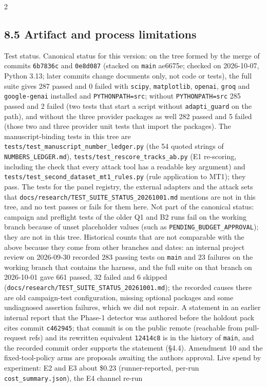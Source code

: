 \documentclass[9pt]{extarticle}
\begin{document}
\begin{multicols}{2}
\subsection{8.5 Artifact and process limitations}

Test status. Canonical status for this version: on the tree formed by the merge of commits \texttt{6b7836c} and \texttt{0e8d087} (stacked on \texttt{main} ae6675e; checked on 2026-10-07, Python 3.13; later commits change documents only, not code or tests), the full suite gives 287 passed and 0 failed with \texttt{scipy}, \texttt{matplotlib}, \texttt{openai}, \texttt{groq} and \texttt{google-genai} installed and \texttt{PYTHONPATH=src}; without \texttt{PYTHONPATH=src} 285 passed and 2 failed (two tests that start a script without \texttt{adapti\_\allowbreak{}guard} on the path), and without the three provider packages as well 282 passed and 5 failed (those two and three provider unit tests that import the packages). The manuscript-binding tests in this tree are \texttt{tests/\allowbreak{}test\_\allowbreak{}manuscript\_\allowbreak{}number\_\allowbreak{}ledger.py} (the 54 quoted strings of \texttt{NUMBERS\_\allowbreak{}LEDGER.md}), \texttt{tests/\allowbreak{}test\_\allowbreak{}rescore\_\allowbreak{}tracks\_\allowbreak{}ab.py} (E1 re-scoring, including the check that every attack tool has a readable key argument) and \texttt{tests/\allowbreak{}test\_\allowbreak{}second\_\allowbreak{}dataset\_\allowbreak{}mt1\_\allowbreak{}rules.py} (rule application to MT1); they pass. The tests for the panel registry, the external adapters and the attack sets that \texttt{docs/\allowbreak{}research/\allowbreak{}TEST\_\allowbreak{}SUITE\_\allowbreak{}STATUS\_\allowbreak{}20261001.md} mentions are not in this tree, and no test passes or fails for them here. Not part of the canonical status: campaign and preflight tests of the older Q1 and B2 runs fail on the working branch because of unset placeholder values (such as \texttt{PENDING\_\allowbreak{}BUDGET\_\allowbreak{}APPROVAL}); they are not in this tree. Historical counts that are not comparable with the above because they come from other branches and dates: an internal project review on 2026-09-30 recorded 283 passing tests on \texttt{main} and 23 failures on the working branch that contains the harness, and the full suite on that branch on 2026-10-01 gave 661 passed, 32 failed and 6 skipped (\texttt{docs/\allowbreak{}research/\allowbreak{}TEST\_\allowbreak{}SUITE\_\allowbreak{}STATUS\_\allowbreak{}20261001.md}); the recorded causes there are old campaign-test configuration, missing optional packages and some undiagnosed assertion failures, which we did not repair. A statement in an earlier internal report that the Phase-1 detector was authored before the holdout pack cites commit \texttt{c462945}; that commit is on the public remote (reachable from pull-request refs) and its rewritten equivalent \texttt{12414c8} is in the history of \texttt{main}, and the recorded commit order supports the statement (§4.4). Amendment 10 and the fixed-tool-policy arms are proposals awaiting the authors\textquotesingle{} approval. Live spend by experiment: E2 and E3 about \$0.23 (runner-reported, per-run \texttt{cost\_\allowbreak{}summary.json}), the E4 channel re-run 
\end{multicols}
\end{document}
